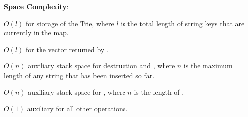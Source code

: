 \textbf{Space Complexity}:
\begin{compactitem}
  \item $O(l)$ for storage of the Trie, where $l$ is the total length of string keys that are currently in the map.
  \item $O(l)$ for the vector returned by .
  \item $O(n)$ auxiliary stack space for destruction and , where $n$ is the maximum length of any string that has been inserted so far.
  \item $O(n)$ auxiliary stack space for , where $n$ is the length of .
  \item $O(1)$ auxiliary for all other operations.
\end{compactitem}

